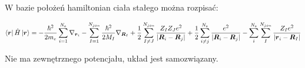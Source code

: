 W bazie położeń hamiltonian ciała stałego można rozpisać:

\begin{equation}
\bra{\boldsymbol{r}}\hat{H}\ket{\boldsymbol{r}}=-\frac{\hbar^2}{2 m_e} \sum_{i=1}^{N_e} \nabla_{\boldsymbol{r}_{i}}-
\sum_{I=1}^{N_{jon}} \frac{\hbar^2}{2 M_I} \nabla_{\boldsymbol{R}_{I}}+
\frac{1}{2}\sum_{I \neq J}^{N_{jon}} \frac{Z_I Z_J e^2}{\left\vert\boldsymbol{R}_{i}-\boldsymbol{R}_{j}\right\vert}+
\frac{1}{2}\sum_{i \neq j}^{N_{e}} \frac{ e^2}{\left\vert\boldsymbol{R}_{i}-\boldsymbol{R}_{j}\right\vert}-
\sum_{i}^{N_{e}}\sum_{I}^{N_{jon}} \frac{Z_I e^2}{\left\vert\boldsymbol{r}_{i}-\boldsymbol{R}_{I}\right\vert}
\end{equation}

Nie ma zewnętrznego potencjału, układ jest samozwiązany.